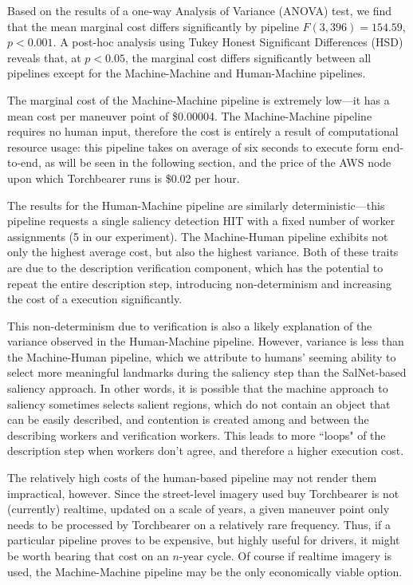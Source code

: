 Based on the results of a one-way Analysis of Variance (ANOVA) test, we find that the mean marginal cost differs significantly by pipeline $F(3, 396)=154.59$, $p < 0.001$. A post-hoc analysis using Tukey Honest Significant Differences (HSD) reveals that, at $p < 0.05$, the marginal cost differs significantly between all pipelines except for the Machine-Machine and Human-Machine pipelines.

The marginal cost of the Machine-Machine pipeline is extremely low---it has a mean cost per maneuver point of \$0.00004. The Machine-Machine pipeline requires no human input, therefore the cost is entirely a result of computational resource usage: this pipeline takes on average of six seconds to execute form end-to-end, as will be seen in the following section, and the price of the AWS node upon which Torchbearer runs is \$0.02 per hour.  

The results for the Human-Machine pipeline are similarly deterministic---this pipeline requests a single saliency detection HIT with a fixed number of worker assignments (5 in our experiment). The Machine-Human pipeline exhibits not only the highest average cost, but also the highest variance. Both of these traits are due to the description verification component, which has the potential to repeat the entire description step, introducing non-determinism and increasing the cost of a execution significantly. 

This non-determinism due to verification is also a likely explanation of the variance observed in the Human-Machine pipeline. However, variance is less than the Machine-Human pipeline, which we attribute to humans' seeming ability to select more meaningful landmarks during the saliency step than the SalNet-based saliency approach. In other words, it is possible that the machine approach to saliency sometimes selects salient regions, which do not contain an object that can be easily described, and contention is created among and between the describing workers and verification workers. This leads to more ``loops" of the description step when workers don't agree, and therefore a higher execution cost.

The relatively high costs of the human-based pipeline may not render them impractical, however. Since the street-level imagery used buy Torchbearer is not (currently) realtime, updated on a scale of years, a given maneuver point only needs to be processed by Torchbearer on a relatively rare frequency. Thus, if a particular pipeline proves to be expensive, but highly useful for drivers, it might be worth bearing that cost on an $n$-year cycle. Of course if realtime imagery is used, the Machine-Machine pipeline may be the only economically viable option. 


